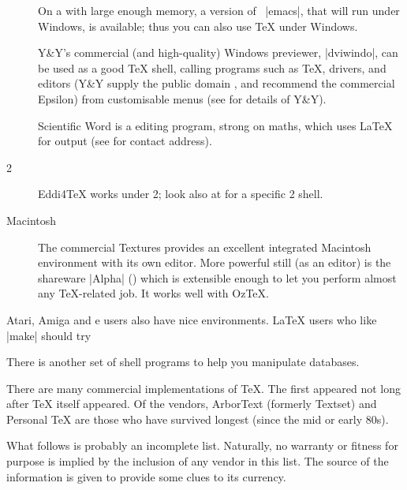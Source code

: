 \begin{description}
  On a  with large enough memory, a version of
  ~\ProgName|emacs|,
  that will run under Windows, is available; thus you can also use
  \TeX{} under Windows.

  Y\&Y's commercial (and high-quality) Windows previewer, \ProgName|dviwindo|,
  can be used as a good \TeX{} shell, calling programs such as \TeX{},
  drivers, and editors (Y\&Y supply the public domain , and
  recommend the commercial Epsilon) from customisable menus
  (see  for details of Y\&Y).

  Scientific Word is a \WYSIWYG{} editing program, strong on maths, which
  uses \LaTeX{} for output (see 
  for contact address).
\item[\acro{OS/}2] Eddi4\TeX{} works under 2; look also at
   for a specific 2 shell.
\item[Macintosh] The commercial Textures provides an excellent integrated
  Macintosh environment with its own editor.  More powerful still (as an
  editor) is the shareware \ProgName|Alpha| () which is
  extensible enough to let you perform almost any \TeX{}-related job. It
  works well with Oz\TeX{}.
\end{description}
Atari, Amiga and e users also have nice environments. \LaTeX{}
users who like \ProgName|make| should try 

There is another set of shell programs to help you manipulate
\BibTeX{} databases.


There are many commercial implementations of \TeX{}. The first
appeared not long after \TeX{} itself appeared. Of the vendors,
ArborText (formerly Textset) and Personal \TeX{} are those who have
survived longest (since the mid or early 80s).

What follows is probably an incomplete list.  Naturally, no warranty or
fitness for purpose is implied by the inclusion of any vendor in this
list.  The source of the information is given to provide some clues to
its currency.

